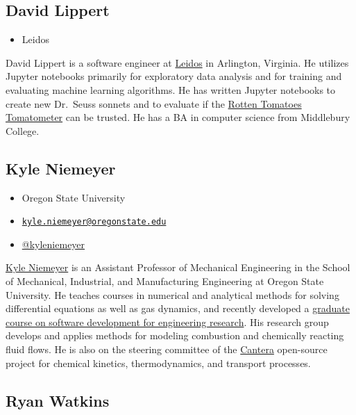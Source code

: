 \documentclass[]{book}
\providecommand{\tightlist}{%
  \setlength{\itemsep}{0pt}\setlength{\parskip}{0pt}}
\begin{document}
\subsection{David Lippert}\label{david-lippert}

\begin{itemize}
\tightlist
\item
  Leidos
\end{itemize}

David Lippert is a software engineer at
\href{https://www.leidos.com}{Leidos} in Arlington, Virginia. He
utilizes Jupyter notebooks primarily for exploratory data analysis and
for training and evaluating machine learning algorithms. He has written
Jupyter notebooks to create new Dr.~Seuss sonnets and to evaluate if the
\href{https://www.rottentomatoes.com/about}{Rotten Tomatoes Tomatometer}
can be trusted. He has a BA in computer science from Middlebury College.

\subsection{Kyle Niemeyer}\label{kyle-niemeyer}

\begin{itemize}
\tightlist
\item
  Oregon State University
\item
  \href{mailto:kyle.niemeyer@oregonstate.edu}{\nolinkurl{kyle.niemeyer@oregonstate.edu}}
\item
  \href{https://twitter.com/kyleniemeyer}{@kyleniemeyer}
\end{itemize}

\href{https://niemeyer-research-group.github.io/}{Kyle Niemeyer} is an
Assistant Professor of Mechanical Engineering in the School of
Mechanical, Industrial, and Manufacturing Engineering at Oregon State
University. He teaches courses in numerical and analytical methods for
solving differential equations as well as gas dynamics, and recently
developed a
\href{https://softwaredevengresearch.github.io/syllabus/}{graduate
course on software development for engineering research}. His research
group develops and applies methods for modeling combustion and
chemically reacting fluid flows. He is also on the steering committee of
the \href{https://cantera.org/}{Cantera} open-source project for
chemical kinetics, thermodynamics, and transport processes.

\subsection{Ryan Watkins}\label{ryan-watkins}
\end{document}
